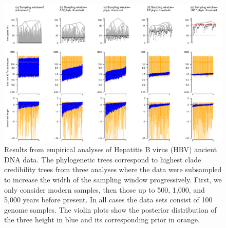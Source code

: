 \documentclass[11pt]{article}
\begin{document}
\begin{landscape}
	\begin{figure}[H]
		\begin{center}
			\includegraphics[scale=0.7, angle=0]{summary_all_estimates_misleading_upwards_prior.pdf}
			\caption{Results from empirical analyses of Hepatitis B virus (HBV) ancient DNA data. The phylogenetic trees correspond to highest clade credibility trees from three analyses where the data were subsampled to increase the width of the sampling window progressively. First, we only consider modern samples, then those up to 500, 1,000, and 5,000 years before present. In all cases the data sets consist of 100 genome samples. The violin plots show the posterior distribution of the three height in blue and its corresponding prior in orange.}
			\label{figure:Fig1}
		\end{center}
	\end{figure}
\end{landscape}
\end{document}
